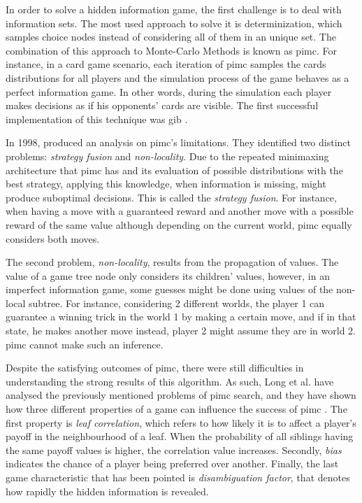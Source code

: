 In order to solve a hidden information game, the first challenge is to deal with information sets.
The most used approach to solve it is determinization, which samples choice nodes instead of considering all of them in an unique set.
The combination of this approach to Monte-Carlo Methods is known as \ac{pimc}.
For instance, in a card game scenario, each iteration of \ac{pimc} samples the cards distributions for all players and the simulation process of the game behaves as a perfect information game.
In other words, during the simulation each player makes decisions as if his opponents' cards are visible.
The first successful implementation of this technique was \ac{gib} \cite{Ginsberg2001}.


In 1998, \citet*{Frank1998} produced an analysis on \ac{pimc}'s limitations.
They identified two distinct problems: \emph{strategy fusion} and \emph{non-locality}.
Due to the repeated minimaxing architecture that \ac{pimc} has and its evaluation of possible distributions with the best strategy, applying this knowledge, when information is missing, might produce suboptimal decisions.
This is called the \emph{strategy fusion}.
For instance, when having a move with a guaranteed reward and another move with a possible reward of the same value although depending on the current world, \ac{pimc} equally considers both moves.


The second problem, \emph{non-locality}, results from the propagation of values.
The value of a game tree node only considers its children' values, however, in an imperfect information game, some guesses might be done using values of the non-local subtree.
For instance, considering 2 different worlds, the player 1 can guarantee a winning trick in the world 1 by making a certain move, and if in that state, he makes another move instead, player 2 might assume they are in world 2.
\ac{pimc} cannot make such an inference.


Despite the satisfying outcomes of \ac{pimc}, there were still difficulties in understanding the strong results of this algorithm.
As such, Long et al. have analysed the previously mentioned problems of \ac{pimc} search, and they have shown how three different properties of a game can influence the success of \ac{pimc} \cite{Long2010}.
The first property is \emph{leaf correlation}, which refers to how likely it is to affect a player's payoff in the neighbourhood of a leaf.
When the probability of all siblings having the same payoff values is higher, the correlation value increases.
Secondly, \emph{bias} indicates the chance of a player being preferred over another.
Finally, the last game characteristic that has been pointed is \emph{disambiguation factor}, that denotes how rapidly the hidden information is revealed.


